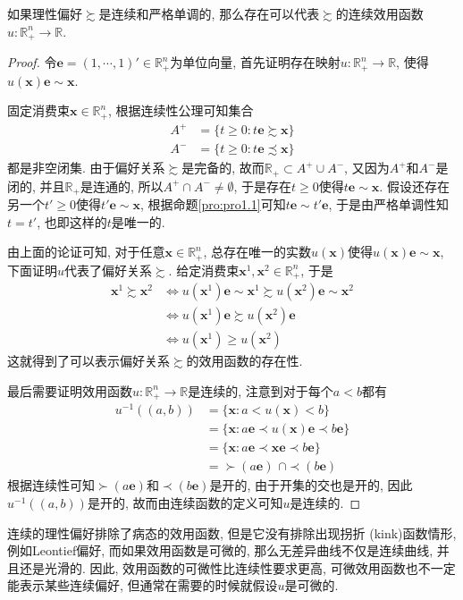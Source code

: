 \documentclass[cn, 12pt, math=mtpro2, bibstyle=apa, blue]{elegantbook}
\newcommand{\R}{\mathbb{R}}
\newcommand{\x}{\mathbf{x}}
\begin{document}
\begin{theorem}\label{thm:thm1.1}
  如果理性偏好$\succsim$是连续和严格单调的, 那么存在可以代表$\succsim$的连续效用函数$u:\R^n_+\to\R$.
\end{theorem}
\begin{proof}
  令$\mathbf{e}=(1,\cdots,1)'\in\R^n_+$为单位向量, 首先证明存在映射$u:\R^n_+\to\R$, 使得$u(\x)\mathbf{e}\sim \x$.

  固定消费束$\x\in\R^n_+$, 根据连续性公理可知集合
  \begin{align*}
  A^+&=\{t\ge0: t\mathbf{e}\succsim \x\} \\
  A^-&=\{t\ge0: t\mathbf{e}\precsim \x\}
  \end{align*}
  都是非空闭集. 由于偏好关系$\succsim$是完备的, 故而$\R_+\subset A^+\cup A^-$, 又因为$A^+$和$A^-$是闭的, 并且$\R_+$是连通的, 所以$A^+\cap A^-\neq\emptyset$, 于是存在$t\ge0$使得$t\mathbf{e}\sim \x$. 假设还存在另一个$t'\ge0$使得$t'\mathbf{e}\sim \x$, 根据命题\ref{pro:pro1.1}可知$t\mathbf{e}\sim t'\mathbf{e}$, 于是由严格单调性知$t=t'$, 也即这样的$t$是唯一的.

  由上面的论证可知, 对于任意$\x\in\mathbb{R}_+^n$, 总存在唯一的实数$u(\x)$使得$u(\x)\mathbf{e}\sim\x$, 下面证明$u$代表了偏好关系$\succsim$. 给定消费束$\x^1, \x^2\in\R_+^n$, 于是
  \begin{align*}
  \x^1\succsim\x^2&\Leftrightarrow u(\x^1)\mathbf{e}\sim \x^1\succsim u(\x^2)\mathbf{e}\sim \x^2 \\
  &\Leftrightarrow u(\x^1)\mathbf{e}\succsim u(\x^2)\mathbf{e} \\
  &\Leftrightarrow u(\x^1)\ge u(\x^2)
  \end{align*}
  这就得到了可以表示偏好关系$\succsim$的效用函数的存在性.

  最后需要证明效用函数$u:\R^n_+\to \R$是连续的, 注意到对于每个$a<b$都有
  \begin{align*}
  u^{-1}((a,b))&=\{\x: a<u(\x)<b\} \\
  &=\{\x: a\mathbf{e}\prec u(\x)\mathbf{e}\prec b\mathbf{e}\} \\
  &=\{\x: a\mathbf{e}\prec \x\mathbf{e}\prec b\mathbf{e}\} \\
  &=\succ (a\mathbf{e})\,\,\cap \prec(b\mathbf{e})
  \end{align*}
  根据连续性可知$\succ(a\mathbf{e})$和$\prec(b\mathbf{e})$是开的, 由于开集的交也是开的, 因此$u^{-1}((a,b))$是开的, 故而由连续函数的定义可知$u$是连续的.
\end{proof}

连续的理性偏好排除了病态的效用函数, 但是它没有排除出现拐折 (kink)函数情形, 例如Leontief偏好, 而如果效用函数是可微的, 那么无差异曲线不仅是连续曲线, 并且还是光滑的. 因此, 效用函数的可微性比连续性要求更高, 可微效用函数也不一定能表示某些连续偏好, 但通常在需要的时候就假设$u$是可微的.
\end{document}

